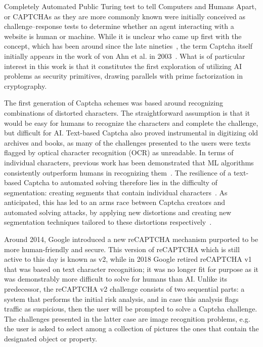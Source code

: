 Completely Automated Public Turing test to tell Computers and Humans Apart, or CAPTCHAs as they are more commonly known were initially conceived as challenge–response tests to determine whether an agent interacting with a website is human or machine.
While it is unclear who came up first with the concept, which has been around since the late nineties~\cite{naor1996verification}, the term Captcha itself initially appears in the work of von Ahn et al. in 2003~\cite{von2003captcha}.
What is of particular interest in this work is that it constitutes the first exploration of utilizing AI problems as security primitives, drawing parallels with prime factorization in cryptography.

The first generation of Captcha schemes was based around recognizing combinations of distorted characters.
The straightforward assumption is that it would be easy for humans to recognize the characters and complete the challenge, but difficult for AI.
Text-based Captcha also proved instrumental in digitizing old archives and books, as many of the challenges presented to the users were texts flagged by optical character recognition (\gls{OCR}) as unreadable.
In terms of individual characters, previous work has been demonstrated that \gls{ML} algorithms consistently outperform humans in recognizing them~\cite{chellapilla2005computers}.
The resilience of a text-based Captcha to automated solving therefore lies in the difficulty of segmentation: creating segments that contain individual characters~\cite{bursztein2014end}.
As anticipated, this has led to an arms race between Captcha creators and automated solving attacks, by applying new distortions and creating new segmentation techniques tailored to these distortions respectively~\cite{cruz2012breaking}.

Around 2014, Google introduced a new reCAPTCHA mechanism purported to be more human-friendly and secure.
This version of reCAPTCHA which is still active to this day is known as v2, while in 2018 Google retired reCAPTCHA v1 that was based on text character recognition; it was no longer fit for purpose as it was demonstrably more difficult to solve for humans than AI.
Unlike its predecessor, the reCAPTCHA v2 challenge consists of two sequential parts: a system that performs the initial risk analysis, and in case this analysis flags traffic as suspicious, then the user will be prompted to solve a Captcha challenge.
The challenges presented in the latter case are image recognition problems, e.g. the user is asked to select among a collection of pictures the ones that contain the designated object or property.

